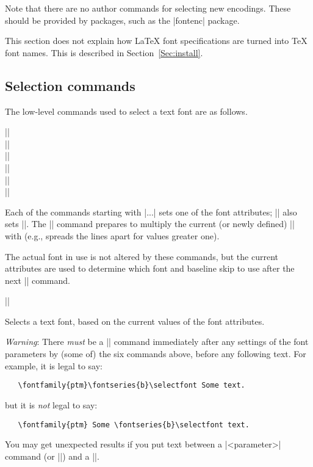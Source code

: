 \documentclass{ltxguide}[1995/11/28]
\begin{document}
Note that there are no author commands for selecting new encodings.
These should be provided by packages, such as the |fontenc| package.

This section does not explain how \LaTeX{} font specifications are
turned into \TeX{} font names.  This is described in
Section~\ref{Sec:install}.

\subsection{Selection commands}

The low-level commands used to select a text font are as follows.

\begin{decl}
  |\fontencoding|  \\
  |\fontfamily|   \\
  |\fontseries|  \\
  |\fontshape|  \\
  |\fontsize|   \\
  |\linespread| 
\end{decl}

Each of the commands starting with |\font...| sets one of the font
attributes; |\fontsize| also sets |\baselineskip|. The |\linespread|
command prepares to multiply the current (or newly defined)
|\baselineskip| with  (e.g., spreads the lines apart for
values greater one).

The actual font in use is not altered by these commands, but the
current attributes are used to determine which font and baseline skip
to use after the next |\selectfont| command.

\begin{decl}
  |\selectfont|
\end{decl}
Selects a text font, based on the current values of the font attributes.

\emph{Warning}: There \emph{must} be a |\selectfont| command immediately
after any settings of the font parameters by (some of) the six commands
above, before any following text.  For example, it is legal to say:
\begin{verbatim}
   \fontfamily{ptm}\fontseries{b}\selectfont Some text.
\end{verbatim}
but it is \emph{not} legal to say:
\begin{verbatim}
   \fontfamily{ptm} Some \fontseries{b}\selectfont text.
\end{verbatim}
You may get unexpected results if you put text between a
|\font<parameter>| command (or |\linespread|) and a |\selectfont|.
\end{document}
